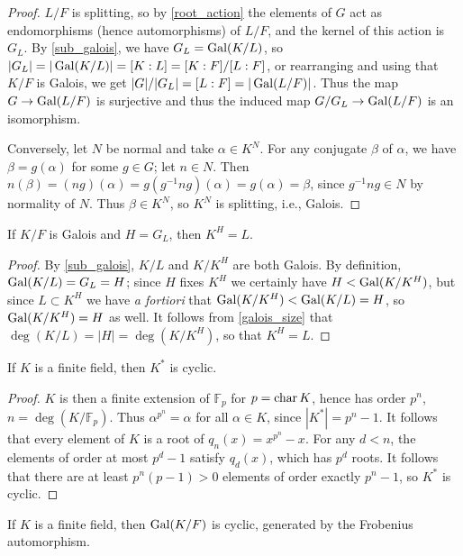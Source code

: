 \begin{proof} $L/F$ is splitting, so by \cref{root_action} the elements of $G$
act as endomorphisms (hence automorphisms) of $L/F$, and the kernel of this action is $G_L$.  By
\cref{sub_galois}, we have $G_L = \operatorname{\text{Gal}}(K/L)$, so $|G_L| = |\operatorname{\text{Gal}}(K/L)| = [K : L] = [K : F] / [L : F]$,
or rearranging and using that $K/F$ is Galois, we get $|G|/|G_L| = [L : F] =
|\operatorname{\text{Gal}}(L/F)|$.  Thus the map $G \to \operatorname{\text{Gal}}(L/F)$ is surjective and thus the induced map $G/G_L \to
\operatorname{\text{Gal}}(L/F)$ is an isomorphism.

Conversely, let $N$ be normal and take $\alpha \in K^N$.  For any conjugate $\beta$ of $\alpha$, we
have $\beta = g(\alpha)$ for some $g \in G$; let $n \in N$.  Then $n(\beta) = (ng)(\alpha) =
g(g^{-1} n g)(\alpha) = g(\alpha) = \beta$, since $g^{-1} n g \in N$ by normality of $N$.  Thus
$\beta \in K^N$, so $K^N$ is splitting, i.e., Galois. \end{proof}

\begin{proposition} If $K/F$ is Galois and $H = G_L$, then $K^H = L$.
\label{fixed_field}
\end{proposition}

\begin{proof} By \cref{sub_galois}, $K/L$ and $K/K^H$ are both Galois.  By
definition, $\operatorname{\text{Gal}}(K/L) = G_L = H$; since $H$ fixes $K^H$ we certainly have
$H < \operatorname{\text{Gal}}(K/K^H)$, but since $L \subset K^H$ we have \emph{a fortiori} that
$\operatorname{\text{Gal}}(K/K^H) < \operatorname{\text{Gal}}(K/L) = H$, so $\operatorname{\text{Gal}}(K/K^H) = H$ as well.  It follows
from \cref{galois_size} that $\deg(K/L) = |H| = \deg(K/K^H)$, so that $K^H =
L$. \end{proof}

\begin{lemma} If $K$ is a finite field, then $K^\ast$ is cyclic.
\label{fin_cyclic}
\end{lemma}

\begin{proof} $K$ is then a finite extension of $\mathbb{F}_p$ for $p =
\operatorname{\text{char}}{K}$, hence has order $p^n$, $n = \deg(K/\mathbb{F}_p)$.  Thus
$\alpha^{p^n} = \alpha$ for all $\alpha \in K$, since $|K^\ast| = p^n - 1$.
It follows that every element of $K$ is a root of $q_n(x) = x^{p^n} - x$.  For
any $d < n$, the elements of order at most $p^d - 1$ satisfy $q_d(x)$, which has
$p^d$ roots.  It follows that there are at least $p^n(p - 1) > 0$ elements of
order exactly $p^n - 1$, so $K^\ast$ is cyclic. \end{proof}

\begin{corollary} If $K$ is a finite field, then $\operatorname{\text{Gal}}(K/F)$ is cyclic, generated by
the Frobenius automorphism.
\label{fin_gal_cyclic}
\end{corollary}

